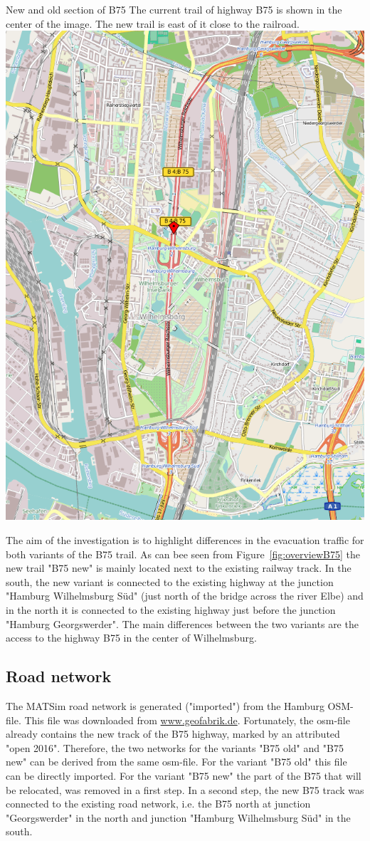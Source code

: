 \createfigure%
{New and old section of B75}%
{The current trail of highway B75 is shown in the center of the image. The new trail is east of it close to the railroad.}%
{\label{fig:overviewB75}}%
{\includegraphics[width=0.7\linewidth]{using/figures/B75overview}}%
{}

The aim of the investigation is to highlight differences in the evacuation traffic for both variants of the B75 trail. As can bee seen from Figure~\ref{fig:overviewB75} the new trail "B75 new" is mainly located next to the existing railway track.
In the south, the new variant is connected to the existing highway at the junction "Hamburg Wilhelmsburg S\"ud" (just north of the bridge across the river Elbe) and in the north it is connected to the existing highway just before the junction "Hamburg Georgswerder". 
The main differences between the two variants are the access to the highway B75 in the center of Wilhelmsburg.

\subsection{Road network}
The MATSim road network is generated ("imported") from the Hamburg OSM-file. This file was downloaded from \url{www.geofabrik.de}. Fortunately, the osm-file already contains the new track of the B75 highway, marked by an attributed "open 2016". Therefore, the two networks for the variants "B75 old" and "B75 new" can be derived from the same osm-file. For the variant "B75 old" this file can be directly imported. For the variant "B75 new" the part of the B75 that will be relocated, was removed in a first step. In a second step, the new B75 track was connected to the existing road network, i.e. the B75 north at junction "Georgswerder" in the north and junction "Hamburg Wilhelmsburg S\"ud" in the south.

